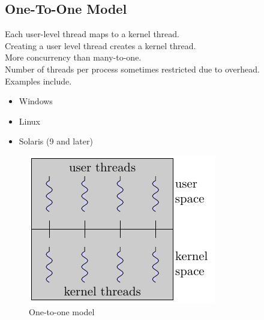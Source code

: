\documentclass[oneside]{book}
\begin{document}
            \subsection{One-To-One Model}
                Each user-level thread maps to a kernel thread.\\
                Creating a user level thread creates a kernel thread.\\
                More concurrency than many-to-one.\\
                Number of threads per process sometimes restricted due to overhead.\\
                Examples include.
                \begin{itemize}
                    \item Windows
                    \item Linux
                    \item Solaris (9 and later)
                \end{itemize}
                \begin{figure}[H]
                    \centering
                    \includegraphics{figures/one_to_one.pdf}
                    \caption{One-to-one model} 
                \end{figure}
\end{document}
